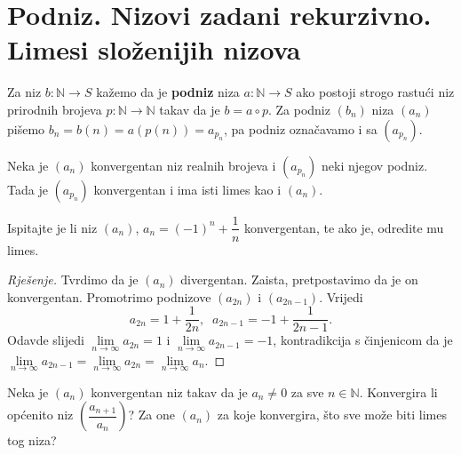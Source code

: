 \section{Podniz. Nizovi zadani rekurzivno. Limesi složenijih nizova}
\begin{definition}
Za niz $b : \mathbb{N}\to S$ kažemo da je \textbf{podniz} niza $a :\mathbb{N}\to S$ ako postoji strogo rastući niz prirodnih brojeva $p : \mathbb{N}\to \mathbb{N}$ takav da je $b=a\circ p$. Za podniz $(b_n)$ niza $(a_n)$ pišemo $b_n=b(n)=a\left(p(n)\right)=a_{p_n}$, pa podniz označavamo i sa $(a_{p_n})$.
\end{definition}
\begin{remark}
\label{onsubsequences}
Neka je $(a_n)$ konvergentan niz realnih brojeva i $(a_{p_n})$ neki njegov podniz. Tada je $(a_{p_n})$ konvergentan i ima isti limes kao i $(a_n)$.
\end{remark}
\begin{exercise}
Ispitajte je li niz $(a_n)$, $a_n=(-1)^n+\dfrac{1}{n}$ konvergentan, te ako je, odredite mu limes.
\end{exercise}
\begin{proof}[Rješenje]
Tvrdimo da je $(a_n)$ divergentan. Zaista, pretpostavimo da je on konvergentan. Promotrimo podnizove $(a_{2n})$ i $(a_{2n-1})$. Vrijedi
$$a_{2n}=1+\dfrac{1}{2n},\;\;
a_{2n-1}=-1+\dfrac{1}{2n-1}.$$
Odavde slijedi $\lim\limits_{n\to \infty}{a_{2n}}=1$ i $\lim\limits_{n\to \infty}{a_{2n-1}}=-1$, kontradikcija s činjenicom da je $\lim\limits_{n\to \infty}{a_{2n-1}}=\lim\limits_{n\to \infty}{a_{2n}}=\lim\limits_{n\to \infty}{a_{n}}$.
\end{proof}
\begin{exercise}
Neka je $(a_n)$ konvergentan niz takav da je $a_n\neq 0$ za sve $n\in \mathbb{N}$. Konvergira li općenito niz $\left(\dfrac{a_{n+1}}{a_n}\right)$? Za one $(a_n)$ za koje konvergira, što sve može biti limes tog niza?
\end{exercise}
